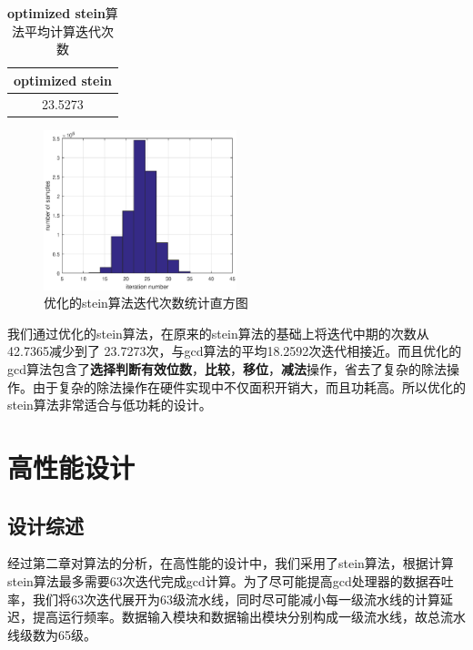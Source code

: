 \documentclass[12pt]{article}
\begin{document}
\begin{table}[H]
\centering
\begin{tabular}{c}
\hline 
optimized stein \\
\hline 
23.5273\\
\hline 
\end{tabular}
\caption{\textbf{optimized stein}算法平均计算迭代次数}
\label{average_iteration_optimized_stein}
\end{table}

\begin{figure}[H]
\begin{center}
\includegraphics[width=0.5\textwidth]{./matlab/stein_op_hist.eps}
\caption{优化的stein算法迭代次数统计直方图}
\end{center}
\end{figure}

我们通过优化的stein算法，在原来的stein算法的基础上将迭代中期的次数从42.7365减少到了
23.7273次，与gcd算法的平均18.2592次迭代相接近。而且优化的gcd算法包含了\textbf{选择判断有效位数}，\textbf{比较}，\textbf{移位}，\textbf{减法}操作，省去了复杂的除法操作。由于复杂的除法操作在硬件实现中不仅面积开销大，而且功耗高。所以优化的stein算法非常适合与低功耗的设计。

\section{高性能设计}
\subsection{设计综述}
经过第二章对算法的分析，在高性能的设计中，我们采用了stein算法，根据计算stein算法最多需要63次迭代完成gcd计算。为了尽可能提高gcd处理器的数据吞吐率，我们将63次迭代展开为63级流水线，同时尽可能减小每一级流水线的计算延迟，提高运行频率。数据输入模块和数据输出模块分别构成一级流水线，故总流水线级数为65级。
\end{document}
